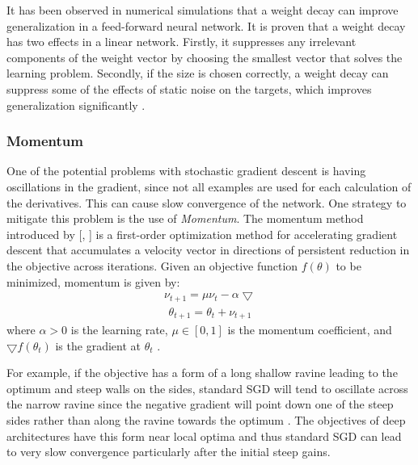  It has been observed in numerical simulations that a weight decay can improve generalization in a feed-forward neural network. It is proven that a weight decay has two effects in a linear network. Firstly, it suppresses any irrelevant components of the weight vector by choosing the smallest vector that solves the learning problem. Secondly, if the size is chosen correctly, a weight decay can suppress some of the effects of static noise on the targets, which improves generalization significantly \cite{moody1995simple}. 

\subsubsection{Momentum}
One of the potential problems with stochastic gradient descent is having oscillations in the gradient, since not all examples are used for each calculation of the derivatives. This can cause slow convergence of the network. One strategy to mitigate this problem is the use of \textit{Momentum}. The momentum method introduced by [\citeauthor{polyak1964some}, \citeyear{polyak1964some}] is a first-order optimization method for accelerating gradient descent that accumulates a velocity vector in directions of persistent reduction in the objective across iterations. Given an objective function $f(\theta)$ to be minimized, momentum is given by:
\begin{equation}
	\label{eq:t}
	\begin{aligned}
		\nu_{t+1} = \mu\nu_t - \alpha\bigtriangledown 
	\end{aligned}
\end{equation}
\begin{equation}
	\label{eq:t}
	\begin{gathered}
	\theta_{t+1} = \theta_t + \nu_{t + 1}
	\end{gathered}
\end{equation}
where $\alpha > 0$ is the learning rate, $\mu \in [0,1]$ is the momentum coefficient, and $\bigtriangledown f(\theta_t)$ is the gradient at $\theta_t$ \cite{sutskever2013importance}. 

For example, if the objective has a form of a long shallow ravine leading to the optimum and steep walls on the sides, standard SGD will tend to oscillate across the narrow ravine since the negative gradient will point down one of the steep sides rather than along the ravine towards the optimum \cite{sgd}. The objectives of deep architectures have this form near local optima and thus standard SGD can lead to very slow convergence particularly after the initial steep gains. 

